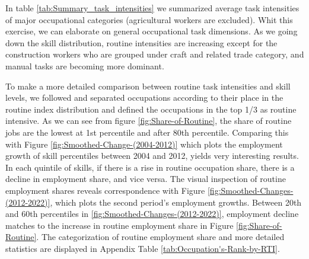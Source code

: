 \begin{onehalfspace}
In table \ref{tab:Summary_task_intensities} we summarized average
task intensities of major occupational categories (agricultural workers
are excluded). Whit this exercise, we can elaborate on general occupational
task dimensions. As we going down the skill distribution, routine
intensities are increasing except for the construction workers who
are grouped under craft and related trade category, and manual tasks
are becoming more dominant.

To make a more detailed comparison between routine task intensities
and skill levels, we followed \citet{2013Autor} and separated occupations
according to their place in the routine index distribution and defined
the occupations in the top 1/3 as routine intensive. As we can see
from figure \ref{fig:Share-of-Routine}, the share of routine jobs
are the lowest at 1st percentile and after 80th percentile. Comparing
this with Figure \ref{fig:Smoothed-Change-(2004-2012)} which plots
the employment growth of skill percentiles between 2004 and 2012,
yields very interesting results. In each quintile of skills, if there
is a rise in routine occupation share, there is a decline in employment
share, and vice versa. The visual inspection of routine employment
shares reveals correspondence with Figure \ref{fig:Smoothed-Changes-(2012-2022)},
which plots the second period's employment growths. Between 20th and
60th percentiles in \ref{fig:Smoothed-Changes-(2012-2022)}, employment
decline matches to the increase in routine employment share in Figure
\ref{fig:Share-of-Routine}. The categorization of routine employment
share and more detailed statistics are displayed in Appendix Table
\ref{tab:Occupation's-Rank-by-RTI}.
\end{onehalfspace}
